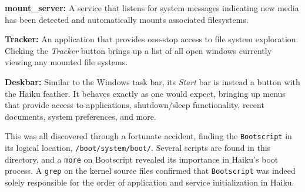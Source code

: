 \documentclass{article}
\begin{document}
\textbf{mount\_server:}
A service that listens for system messages indicating new media has been detected and automatically mounts associated filesystems.\cite{AutoMounter}

\textbf{Tracker:}
An application that provides one-stop access to file system exploration. Clicking the \textit{Tracker} button brings up a list of all open windows currently viewing any mounted file systems.\cite{Tracker}

\textbf{Deskbar:}
Similar to the Windows task bar, its \textit{Start} bar is instead a button with the Haiku feather. It behaves exactly as one would expect, bringing up menus that provide access to applications, shutdown/sleep functionality, recent documents, system preferences, and more.\cite{Deskbar}

This was all discovered through a fortunate accident, finding the \texttt{Bootscript} in its logical location, \texttt{/boot/system/boot/}. Several scripts are found in this directory, and a \texttt{more} on Bootscript revealed its importance in Haiku's boot process. A \texttt{grep} on the kernel source files confirmed that \texttt{Bootscript} was indeed solely responsible for the order of application and service initialization in Haiku.

{}

\end{document}
